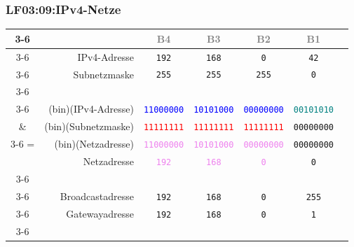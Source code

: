 \begin{frame}[fragile]  
  \frametitle{LF03:09:IPv4-Netze}
  \vspace{0.2cm}
  \begin{footnotesize}
  \begin{center}
    \renewcommand{\arraystretch}{1.3}
    \begin{tabular}{cr|c|c|c|c|c|}
    \cline{3-6}
    & &  \textcolor{gray}{\tiny{B4}} & \textcolor{gray}{\tiny{B3}} & \textcolor{gray}{\tiny{B2}} 
    &  \textcolor{gray}{\tiny{B1}}  \\
	  \cline{3-6}
	  & IPv4-Adresse & \texttt{192} & \texttt{168} & \texttt{0} & \texttt{42} \\
    \cline{3-6}
    & Subnetzmaske & \texttt{255} & \texttt{255} & \texttt{255} & \texttt{0}\\
    \cline{3-6}\\
    \cline{3-6}
	  & (bin)(IPv4-Adresse) & \textcolor{blue}{\texttt{11000000}} & \textcolor{blue}{\texttt{10101000}} & \textcolor{blue}{\texttt{00000000}} & \textcolor{teal}{\texttt{00101010}} \\
    \& & (bin)(Subnetzmaske) & \textcolor{red}{\texttt{11111111}} & \textcolor{red}{\texttt{11111111}} & \textcolor{red}{\texttt{11111111}} & \texttt{00000000}\\
    \cline{3-6}
    = & (bin)(Netzadresse) & \textcolor{violet}{\texttt{11000000}} & \textcolor{violet}{\texttt{10101000}} & \textcolor{violet}{\texttt{00000000}} & \texttt{00000000} \\
   
    & Netzadresse & \textcolor{violet}{\texttt{192}} & \textcolor{violet}{\texttt{168}} & \textcolor{violet}{\texttt{0}} & \texttt{0} \\
    \cline{3-6}\\
    \cline{3-6}
    & Broadcastadresse & \texttt{192} & \texttt{168} & \texttt{0} & \texttt{255} \\
    \cline{3-6}
    & Gatewayadresse & \texttt{192} & \texttt{168} & \texttt{0} & \texttt{1} \\
    \cline{3-6}

  \end{tabular}
\end{center}
\end{footnotesize}
\end{frame}

